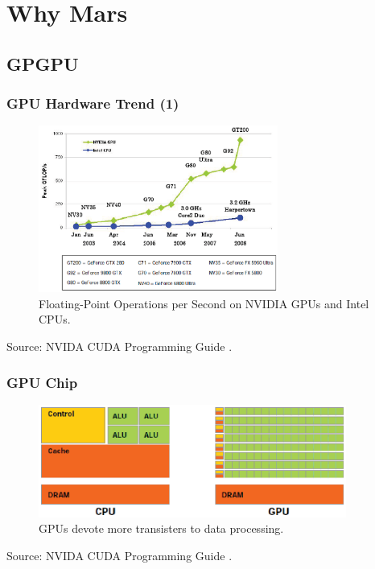 \section{Why Mars}
\subsection{GPGPU}

\begin{frame}
\frametitle{GPU Hardware Trend (1)}
\begin{figure}[ht]
\centering
\includegraphics[width=0.70\textwidth]{figure/compute.eps}
\caption{\scriptsize{Floating-Point Operations per Second on NVIDIA GPUs and Intel CPUs.}}
\end{figure}
\vspace{-1em}
\tiny{Source: NVIDA CUDA Programming Guide \cite{CUDA2008}.}
\end{frame}


\begin{frame}
\frametitle{GPU Chip}
\begin{figure}[ht]
\centering
\includegraphics[width=0.90\textwidth]{figure/transistor.eps}
\caption{GPUs devote more transisters to data processing.}
\end{figure}
\tiny{Source: NVIDA CUDA Programming Guide \cite{CUDA2008}.}
\end{frame}

